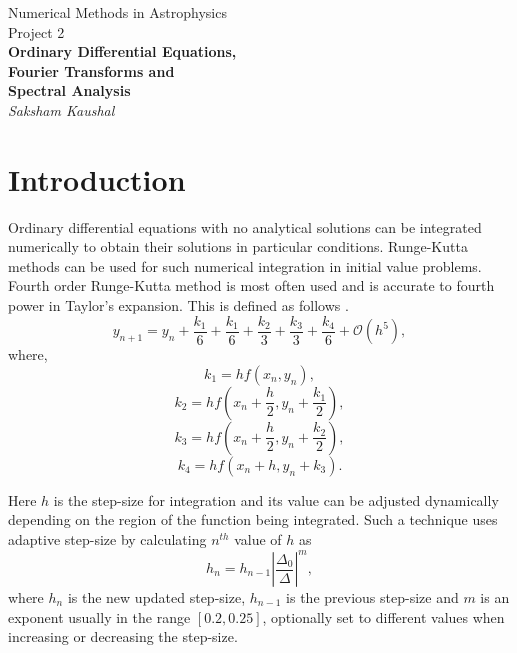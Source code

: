 \documentclass[a4paper]{article}
\begin{document}
	
	
	\begin{titlepage}
		\begin{center}
			\Large Numerical Methods in Astrophysics \\
			\vspace{1cm}
			\huge{
				Project 2 \\
				\vspace{0.5cm}
				\textbf{Ordinary Differential Equations,}\\
				\textbf{Fourier Transforms and} \\
				\textbf{Spectral Analysis} \\
				\vspace{1cm}
			}
			\Large \emph{Saksham Kaushal}
		\end{center}
	\end{titlepage}
	
	
	\tableofcontents
	\newpage
	
	
	\section{Introduction} \label{introduction}
	
	Ordinary differential equations with no analytical solutions can be integrated numerically to obtain their solutions in particular conditions. Runge-Kutta methods can be used for such numerical integration in initial value problems. Fourth order Runge-Kutta method is most often used and is accurate to fourth power in Taylor's expansion. This is defined as follows \cite{press_numerical_1992}.
	\begin{equation}
		y_{n+1} = y_n + \frac{k_1}{6} + \frac{k_1}{6} + \frac{k_2}{3} + \frac{k_3}{3} + \frac{k_4}{6} + \mathcal{O}(h^5),
		\label{eq:RK}
	\end{equation} where,
	\[k_1 = hf(x_n,y_n),\]
	\[k_2 = hf(x_n+\frac{h}{2},y_n+\frac{k_1}{2}),\]
	\[k_3 = hf(x_n+\frac{h}{2},y_n+\frac{k_2}{2}),\]
	\[k_4 = hf(x_n+h,y_n+k_3).\]
	
	Here \(h\) is the step-size for integration and its value can be adjusted dynamically depending on the region of the function being integrated. Such a technique uses adaptive step-size by calculating \(n^{th}\) value of \(h\) as \cite{lecture_3} 
	\begin{equation}
		h_n = h_{n-1} \left| \frac{\Delta_0}{\Delta} \right| ^m,
		\label{eq:stepsize}
	\end{equation}
	where \(h_n\) is the new updated step-size, \(h_{n-1}\) is the previous step-size and \(m\) is an exponent usually in the range \([0.2,0.25]\), optionally set to different values when increasing or decreasing the step-size.\\~\\
	
\end{document}

